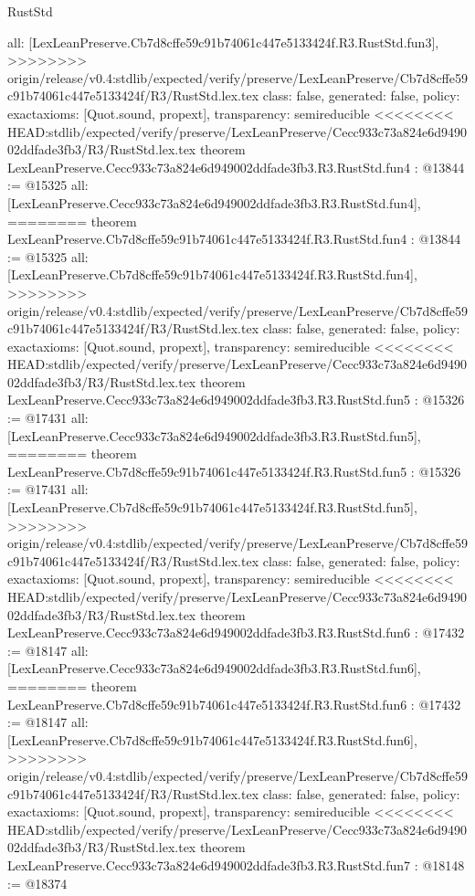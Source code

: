 \begin{lexlean}{RustStd}
\begin{coremodule}
{\begin{coremodule}
{{{{{{{  all: [LexLeanPreserve.Cb7d8cffe59c91b74061c447e5133424f.R3.RustStd.fun3],
>>>>>>>> origin/release/v0.4:stdlib/expected/verify/preserve/LexLeanPreserve/Cb7d8cffe59c91b74061c447e5133424f/R3/RustStd.lex.tex
  class: false,
  generated: false,
  policy: exact{axioms: [Quot.sound, propext]},
  transparency: semireducible
}
<<<<<<<< HEAD:stdlib/expected/verify/preserve/LexLeanPreserve/Cecc933c73a824e6d949002ddfade3fb3/R3/RustStd.lex.tex
theorem LexLeanPreserve.Cecc933c73a824e6d949002ddfade3fb3.R3.RustStd.fun4 : @13844 := @15325 {
  all: [LexLeanPreserve.Cecc933c73a824e6d949002ddfade3fb3.R3.RustStd.fun4],
========
theorem LexLeanPreserve.Cb7d8cffe59c91b74061c447e5133424f.R3.RustStd.fun4 : @13844 := @15325 {
  all: [LexLeanPreserve.Cb7d8cffe59c91b74061c447e5133424f.R3.RustStd.fun4],
>>>>>>>> origin/release/v0.4:stdlib/expected/verify/preserve/LexLeanPreserve/Cb7d8cffe59c91b74061c447e5133424f/R3/RustStd.lex.tex
  class: false,
  generated: false,
  policy: exact{axioms: [Quot.sound, propext]},
  transparency: semireducible
}
<<<<<<<< HEAD:stdlib/expected/verify/preserve/LexLeanPreserve/Cecc933c73a824e6d949002ddfade3fb3/R3/RustStd.lex.tex
theorem LexLeanPreserve.Cecc933c73a824e6d949002ddfade3fb3.R3.RustStd.fun5 : @15326 := @17431 {
  all: [LexLeanPreserve.Cecc933c73a824e6d949002ddfade3fb3.R3.RustStd.fun5],
========
theorem LexLeanPreserve.Cb7d8cffe59c91b74061c447e5133424f.R3.RustStd.fun5 : @15326 := @17431 {
  all: [LexLeanPreserve.Cb7d8cffe59c91b74061c447e5133424f.R3.RustStd.fun5],
>>>>>>>> origin/release/v0.4:stdlib/expected/verify/preserve/LexLeanPreserve/Cb7d8cffe59c91b74061c447e5133424f/R3/RustStd.lex.tex
  class: false,
  generated: false,
  policy: exact{axioms: [Quot.sound, propext]},
  transparency: semireducible
}
<<<<<<<< HEAD:stdlib/expected/verify/preserve/LexLeanPreserve/Cecc933c73a824e6d949002ddfade3fb3/R3/RustStd.lex.tex
theorem LexLeanPreserve.Cecc933c73a824e6d949002ddfade3fb3.R3.RustStd.fun6 : @17432 := @18147 {
  all: [LexLeanPreserve.Cecc933c73a824e6d949002ddfade3fb3.R3.RustStd.fun6],
========
theorem LexLeanPreserve.Cb7d8cffe59c91b74061c447e5133424f.R3.RustStd.fun6 : @17432 := @18147 {
  all: [LexLeanPreserve.Cb7d8cffe59c91b74061c447e5133424f.R3.RustStd.fun6],
>>>>>>>> origin/release/v0.4:stdlib/expected/verify/preserve/LexLeanPreserve/Cb7d8cffe59c91b74061c447e5133424f/R3/RustStd.lex.tex
  class: false,
  generated: false,
  policy: exact{axioms: [Quot.sound, propext]},
  transparency: semireducible
}
<<<<<<<< HEAD:stdlib/expected/verify/preserve/LexLeanPreserve/Cecc933c73a824e6d949002ddfade3fb3/R3/RustStd.lex.tex
theorem LexLeanPreserve.Cecc933c73a824e6d949002ddfade3fb3.R3.RustStd.fun7 : @18148 := @18374 {
}}}}}}}}}}
\end{coremodule}}
\end{coremodule}
\end{lexlean}
